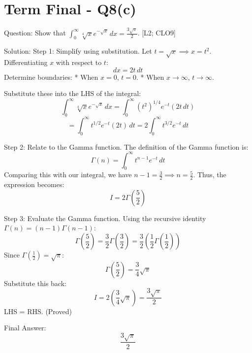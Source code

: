\documentclass[11pt, a4paper]{article}
\begin{document}

\section*{Term Final - Q8(c)}

Question:
Show that $\int_{0}^{\infty} \sqrt[4]{x} e^{-\sqrt{x}} \, dx = \frac{3\sqrt{\pi}}{2}$. [L2; CLO9]

Solution:
Step 1: Simplify using substitution.
Let $t = \sqrt{x} \implies x = t^2$.
Differentiating $x$ with respect to $t$:
\[
dx = 2t \, dt
\]
Determine boundaries:
* When $x = 0$, $t = 0$.
* When $x \to \infty$, $t \to \infty$.

Substitute these into the LHS of the integral:
\[
\int_{0}^{\infty} \sqrt[4]{x} e^{-\sqrt{x}} \, dx = \int_{0}^{\infty} (t^2)^{1/4} e^{-t} (2t \, dt)
\]
\[
= \int_{0}^{\infty} t^{1/2} e^{-t} (2t) \, dt = 2 \int_{0}^{\infty} t^{3/2} e^{-t} \, dt
\]

Step 2: Relate to the Gamma function.
The definition of the Gamma function is:
\[
\Gamma(n) = \int_{0}^{\infty} t^{n-1} e^{-t} \, dt
\]
Comparing this with our integral, we have $n - 1 = \frac{3}{2} \implies n = \frac{5}{2}$.
Thus, the expression becomes:
\[
I = 2 \Gamma\left(\frac{5}{2}\right)
\]

Step 3: Evaluate the Gamma function.
Using the recursive identity $\Gamma(n) = (n-1)\Gamma(n-1)$:
\[
\Gamma\left(\frac{5}{2}\right) = \frac{3}{2} \Gamma\left(\frac{3}{2}\right) = \frac{3}{2} \left( \frac{1}{2} \Gamma\left(\frac{1}{2}\right) \right)
\]
Since $\Gamma\left(\frac{1}{2}\right) = \sqrt{\pi}$:
\[
\Gamma\left(\frac{5}{2}\right) = \frac{3}{4} \sqrt{\pi}
\]
Substitute this back:
\[
I = 2 \left( \frac{3}{4} \sqrt{\pi} \right) = \frac{3\sqrt{\pi}}{2}
\]
LHS = RHS. (Proved)

Final Answer:
\[
\boxed{\frac{3\sqrt{\pi}}{2}}
\]

\end{document}
